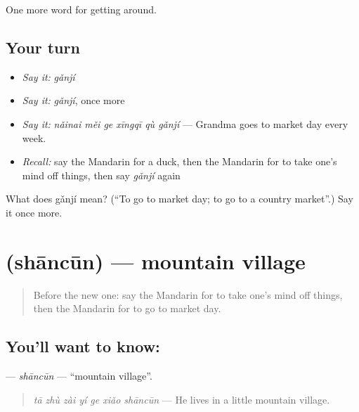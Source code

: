 \begin{grammarlens}[title={What you've built}]
One more word for getting around.
\end{grammarlens}

\subsection*{Your turn}
\begin{itemize}
\raggedright
  \item \emph{Say it:} \emph{gǎnjí}
  \item \emph{Say it:} \emph{gǎnjí}, once more
  \item \emph{Say it:} \emph{nǎinai měi ge xīngqī qù gǎnjí} — Grandma goes to market day every week.
  \item \emph{Recall:} say the Mandarin for a duck, then the Mandarin for to take one's mind off things, then say \emph{gǎnjí} again
\end{itemize}

\begin{tcolorbox}[breakable,colback=teal!4,colframe=teal!35!black,title={Before you move on}]
What does gǎnjí mean? (\textquotedblleft{}To go to market day; to go to a country market\textquotedblright{}.) Say it once more.
\end{tcolorbox}
\section[\texorpdfstring{\zh{山村} (shāncūn)}{山村 (shāncūn)}]{ (shāncūn) — mountain village}

\label{lesson:ZH-C440-shancun}



\begin{quote}
Before the new one: say the Mandarin for to take one's mind off things, then the Mandarin for to go to market day.
\end{quote}

\subsection*{You'll want to know: }
\textbf{} — \emph{shāncūn} — \textquotedblleft{}mountain village\textquotedblright{}.

\begin{quote}
\emph{tā zhù zài yí ge xiǎo shāncūn} — He lives in a little mountain village.
\end{quote}

